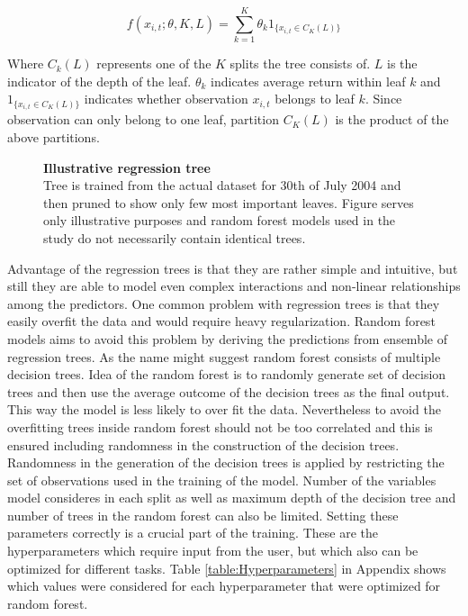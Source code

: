 \documentclass{article}
\begin{document}
\begin{equation}
f(x_{i, t}; \theta, K, L) = \sum_{k=1}^K \theta_k 1 _{\{x_{i, t} \in C_K(L)\}}
\end{equation}

Where $C_k(L)$ represents one of the $K$ splits the tree consists of. $L$ is the indicator of the depth of the leaf. $\theta_k$ indicates average return within leaf $k$ and $1 _{\{x_{i, t} \in C_K(L)\}}$ indicates whether observation $x_{i, t}$ belongs to leaf $k$. Since observation can only belong to one leaf, partition $C_K(L)$ is the product of the above partitions.

\begin{figure}[ht]
\centering
\caption[Illustrative regression tree]{\textbf{Illustrative regression tree}\\ Tree is trained from the actual dataset for 30th of July 2004 and then pruned to show only few most important leaves. Figure serves only illustrative purposes and random forest models used in the study do not necessarily contain identical trees. }

\label{plot:regre_tree}
\end{figure}

Advantage of the regression trees is that they are rather simple and intuitive, but still they are able to model even complex interactions and non-linear relationships among the predictors. One common problem with regression trees is that they easily overfit the data and would require heavy regularization. Random forest models aims to avoid this problem by deriving the predictions from ensemble of regression trees. As the name might suggest random forest consists of multiple decision trees. Idea of the random forest is to randomly generate set of decision trees and then use the average outcome of the decision trees as the final output. This way the model is less likely to over fit the data. Nevertheless to avoid the overfitting trees inside random forest should not be too correlated and this is ensured including randomness in the construction of the decision trees. Randomness in the generation of the decision trees is applied by restricting the set of observations used in the training of the model. Number of the variables model consideres in each split as well as maximum depth of the decision tree and number of trees in the random forest can also be limited. Setting these parameters correctly is a crucial part of the training. These are the hyperparameters which require input from the user, but which also can be optimized for different tasks. Table \ref{table:Hyperparameters} in Appendix shows which values were considered for each hyperparameter that were optimized for random forest.
\end{document}
